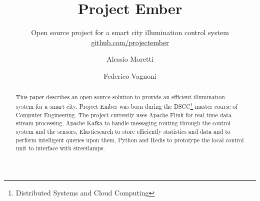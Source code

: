 \documentclass[sigconf, authordraft]{acmart}
\begin{document}
\title{Project Ember}
\subtitle{Open source project for a smart city illumination control system
\break \url{github.com/projectember}}

\author{Alessio Moretti}

\author{Federico Vagnoni}


\begin{abstract}
	This paper describes an open source solution to provide an efficient illumination system for a smart city. Project Ember was born during the DSCC\footnote{Distributed Systems and Cloud Computing} master course of Computer Engineering. The project currently uses Apache Flink for real-time data stream processing, Apache Kafka to handle messaging routing through the control system and the sensors, Elasticsearch to store efficiently statistics and data and to perform intelligent queries upon them, Python and Redis to prototype the local control unit to interface with streetlamps.
\end{abstract}


	
\maketitle
	

	

\end{document}
